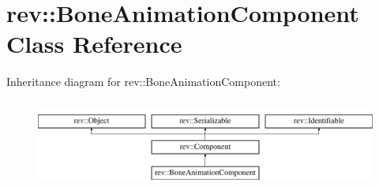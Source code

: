 \hypertarget{classrev_1_1_bone_animation_component}{}\section{rev\+::Bone\+Animation\+Component Class Reference}
\label{classrev_1_1_bone_animation_component}
Inheritance diagram for rev\+::Bone\+Animation\+Component\+:\begin{figure}[H]
\begin{center}
\leavevmode
\includegraphics[height=2.916667cm]{classrev_1_1_bone_animation_component}
\end{center}
\end{figure}
